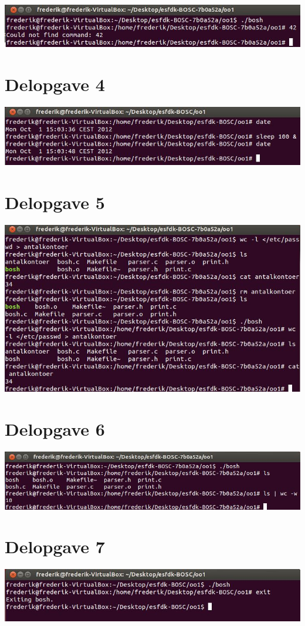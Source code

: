 \includegraphics{Images/TestOfPart3_4}
\label{Test3_4}

\section{Delopgave 4}
\includegraphics{Images/TestOfPart4}
\label{Test4}

\section{Delopgave 5}
\includegraphics{Images/TestOfPart5}
\label{Test5}

\section{Delopgave 6}
\includegraphics{Images/TestOfPart6}
\label{Test6}

\section{Delopgave 7}
\includegraphics{Images/TestOfPart7}
\label{Test7}

